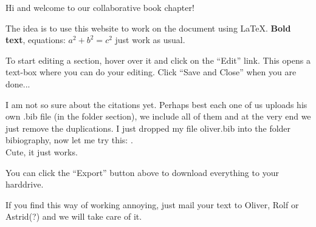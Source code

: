 Hi and welcome to our collaborative book chapter!  

The idea is to use this website to work on the document using \LaTeX.  \textbf{Bold text}, equations: $a^2+b^2=c^2$ just work as usual.  

To start editing a section, hover over it and click on the ``Edit'' link.  This opens a text-box where you can do your editing.  Click ``Save and Close'' when you are done...

I am not so sure about the citations yet.  Perhaps best each one of us uploads his own .bib file (in the folder section), we include all of them and at the very end we just remove the duplications.  
I just dropped my file oliver.bib into the folder bibiography, now let me try this: \cite{buehler2012}.\\
Cute, it just works.  

You can click the ``Export'' button above to download everything to your harddrive.  

If you find this way of working annoying, just mail your text to Oliver, Rolf or Astrid(?) and we will take care of it.  